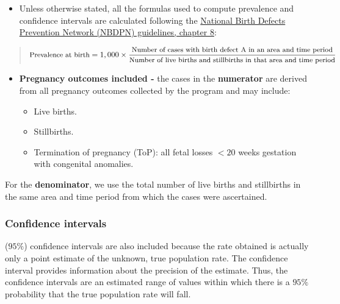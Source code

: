 \documentclass[
]{krantz}
\providecommand{\tightlist}{%
  \setlength{\itemsep}{0pt}\setlength{\parskip}{0pt}}
\begin{document}
\begin{itemize}
\tightlist
\item
  Unless otherwise stated, all the formulas used to compute prevalence and confidence intervals are calculated following the \href{http://www.nbdpn.org/docs/Ch_8_Statistics6-04_2016DEC14.pdf}{National Birth Defects Prevention Network (NBDPN) guidelines, chapter 8}:
\end{itemize}

\begin{quote}
\[\small{\text{Prevalence at birth}} = 1,000 \times \dfrac{\small{\text{Number of cases with birth defect A in an area and time period}}}{\small{\text{Number of live births and stillbirths in that area and time period}}}\]
\end{quote}

\begin{itemize}
\tightlist
\item
  \textbf{Pregnancy outcomes included -} the cases in the \textbf{numerator} are derived from all pregnancy outcomes collected by the program and may include:

  \begin{itemize}
  \tightlist
  \item
    Live births.
  \item
    Stillbirths.
  \item
    Termination of pregnancy (ToP): all fetal losses \(< 20\) weeks gestation with congenital anomalies.
  \end{itemize}
\end{itemize}

For the \textbf{denominator}, we use the total number of live births and stillbirths in the same area and time period from which the cases were ascertained.

\hypertarget{confidence-intervals}{%
\subsubsection*{Confidence intervals}\label{confidence-intervals}}


(\(95\%\)) confidence intervals are also included because the rate obtained is actually only a point estimate of the unknown, true population rate. The confidence interval provides information about the precision of the estimate. Thus, the confidence intervals are an estimated range of values within which there is a \(95\%\) probability that the true population rate will fall.
\end{document}
